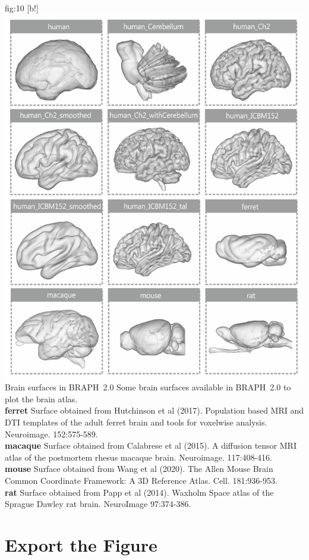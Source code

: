 \documentclass[justified]{tufte-handout}
\begin{document}
	{fig:10}
	{[b!] \includegraphics{tut_ba/fig10.png}}
	{Brain surfaces in BRAPH~2.0}
	{
	Some brain surfaces available in BRAPH~2.0 to plot the brain atlas. \\
	{\bf ferret} Surface obtained from Hutchinson et al (2017). Population based MRI and DTI templates of the adult ferret brain and tools for voxelwise
	analysis. 	Neuroimage. 152:575-589.  \\
	{\bf macaque} Surface obtained from Calabrese et al (2015). A diffusion tensor MRI atlas of the postmortem rhesus macaque brain. Neuroimage.
	117:408-416. \\
	{\bf mouse} Surface obtained from Wang et al (2020). The Allen Mouse Brain Common Coordinate Framework: A 3D Reference Atlas. Cell. 181:936-953. \\
	{\bf rat} Surface obtained from Papp et al (2014).  Waxholm Space atlas of the Sprague Dawley rat brain. NeuroImage 97:374-386. \\
	}

\clearpage
\section{Export the Figure}
\end{document}

